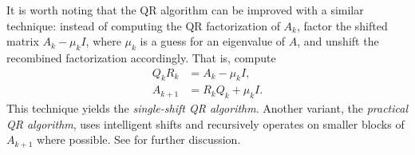 It is worth noting that the QR algorithm can be improved with a similar technique: instead of computing the QR factorization of $A_k$, factor the shifted matrix $A_{k} - \mu_k I$, where $\mu_k$ is a guess for an eigenvalue of $A$, and unshift the recombined factorization accordingly.
That is, compute
\begin{align*}
    Q_k R_k &= A_k - \mu_k I,\\
    A_{k+1} &= R_k Q_k + \mu_k I.
\end{align*}
This technique yields the \emph{single-shift QR algorithm}.
Another variant, the \emph{practical QR algorithm}, uses intelligent shifts and recursively operates on smaller blocks of $A_{k+1}$ where possible.
See \cite{quarteroni2010numerical,Trefethen1997} for further discussion.

